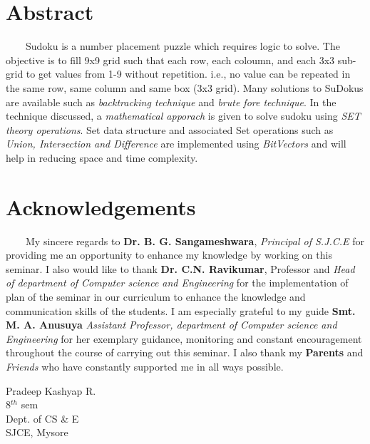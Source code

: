 \documentclass[12pt,a4paper]{article}
\begin{document}
\newpage
\thispagestyle{empty}
\section{Abstract}
\doublespacing

	\ \ \ \ Sudoku is a number placement puzzle which requires logic to solve. The objective is to fill 9x9 grid such that each row, each coloumn, and each 3x3 sub-grid to get values from 1-9 without repetition. i.e., no value can be repeated in the same row, same column and same box (3x3 grid). Many solutions to SuDokus are available such as \textit{backtracking technique} and \textit{brute fore technique}. In the technique discussed, a \textit{mathematical apporach} is given to solve sudoku using \textit{SET theory operations}. Set data structure and associated Set operations such as \textit{Union, Intersection and Difference} are implemented using \textit{BitVectors} and will help in reducing space and time complexity.

\newpage
\thispagestyle{empty}

\section{Acknowledgements}

\ \ \ \ My sincere regards to \textbf{Dr. B. G. Sangameshwara}, \textit{Principal of S.J.C.E} for providing me an opportunity to enhance my knowledge by working on this seminar. I also would like to thank \textbf{Dr. C.N. Ravikumar}, Professor and \textit{Head of department of Computer science and Engineering} for the implementation of plan of the seminar in our curriculum to enhance the knowledge and communication skills of the students. I am especially grateful to my guide \textbf{Smt. M. A. Anusuya} \textit{Assistant Professor, department of Computer science and Engineering} for her exemplary guidance, monitoring and constant encouragement throughout the course of carrying out this seminar.  I also thank my \textbf{Parents} and \textit{Friends} who have constantly supported me in all ways possible.

\vspace{10cm} 
\begin{flushright}
Pradeep Kashyap R.\\
8$^{th}$ sem\\
Dept. of CS \& E\\
SJCE, Mysore\\
\end{flushright}
\end{document}
